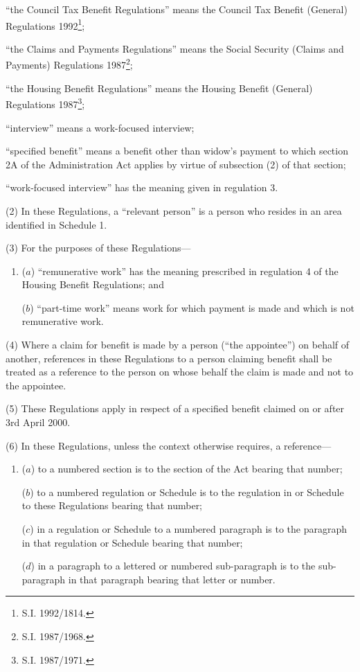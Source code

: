 \documentclass[12pt,a4paper]{article}
\begin{document}
\begin{enumerate}
“the Council Tax Benefit Regulations” means the Council Tax Benefit (General) Regulations 1992\footnote{\frenchspacing S.I. 1992/1814.};

“the Claims and Payments Regulations” means the Social Security (Claims and Payments) Regulations 1987\footnote{\frenchspacing S.I. 1987/1968.};

“the Housing Benefit Regulations” means the Housing Benefit (General) Regulations 1987\footnote{\frenchspacing S.I. 1987/1971.};

“interview” means a work-focused interview;

“specified benefit” means a benefit other than widow’s payment to which section 2A of the Administration Act applies by virtue of subsection (2) of that section;

“work-focused interview” has the meaning given in regulation 3.
\end{enumerate}

(2) In these Regulations, a “relevant person” is a person who resides in an area identified in Schedule 1.

(3) For the purposes of these Regulations—
\begin{enumerate}\item[]
($a$) “remunerative work” has the meaning prescribed in regulation 4 of the Housing Benefit Regulations; and

($b$) “part-time work” means work for which payment is made and which is not remunerative work.
\end{enumerate}

(4) Where a claim for benefit is made by a person (“the appointee”) on behalf of another, references in these Regulations to a person claiming benefit shall be treated as a reference to the person on whose behalf the claim is made and not to the appointee.

(5) These Regulations apply in respect of a specified benefit claimed on or after 3rd April 2000.

(6) In these Regulations, unless the context otherwise requires, a reference—
\begin{enumerate}\item[]
($a$) to a numbered section is to the section of the Act bearing that number;

($b$) to a numbered regulation or Schedule is to the regulation in or Schedule to these Regulations bearing that number;

($c$) in a regulation or Schedule to a numbered paragraph is to the paragraph in that regulation or Schedule bearing that number;

($d$) in a paragraph to a lettered or numbered sub-paragraph is to the sub-paragraph in that paragraph bearing that letter or number.
\end{enumerate}
\end{document}
